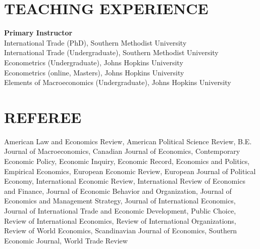 \documentclass[11pt]{res}
\begin{document}
\begin{resume}
\section{TEACHING EXPERIENCE} \vspace{1.5mm}
{\bf Primary Instructor}\vspace{1.5mm}\\
International Trade (PhD), Southern Methodist University\vspace{1.5mm}\\
International Trade (Undergraduate), Southern Methodist University\vspace{1.5mm}\\
Econometrics (Undergraduate), Johns Hopkins University\vspace{1.5mm}\\
Econometrics (online, Masters), Johns Hopkins University\vspace{1.5mm}\\
Elements of Macroeconomics (Undergraduate), Johns Hopkins University\vspace{1.5mm}\\

\section{REFEREE} \vspace{1.5mm}
American Law and Economics Review, American Political Science Review, B.E. Journal of Macroeconomics, Canadian Journal of Economics, Contemporary Economic Policy, Economic Inquiry, 
Economic Record, Economics and Politics, Empirical Economics, European Economic Review, European Journal of Political Economy, International Economic Review, International Review of Economics and Finance, Journal of Economic Behavior and Organization, Journal of Economics and Management Strategy, 
Journal of International Economics, Journal of International Trade and Economic Development, Public Choice, Review of International Economics, Review of International Organizations, Review of World Economics, Scandinavian Journal of Economics, Southern Economic Journal, World Trade Review
\end{resume}
\end{document}

